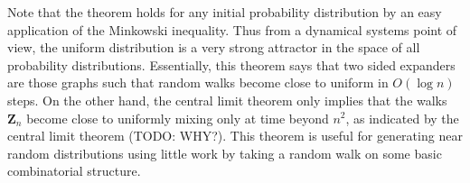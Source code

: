 Note that the theorem holds for any initial probability distribution by an easy application of the Minkowski inequality. Thus from a dynamical systems point of view, the uniform distribution is a very strong attractor in the space of all probability distributions. Essentially, this theorem says that two sided expanders are those graphs such that random walks become close to uniform in $O(\log n)$ steps. On the other hand, the central limit theorem only implies that the walks $\mathbf{Z}_n$ become close to uniformly mixing only at time beyond $n^2$, as indicated by the central limit theorem (TODO: WHY?). This theorem is useful for generating near random distributions using little work by taking a random walk on some basic combinatorial structure.

